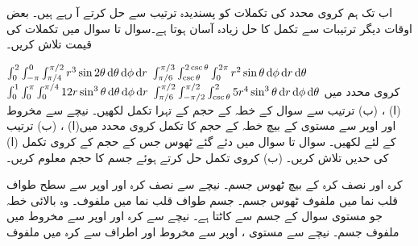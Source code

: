 اب تک ہم   کروی  محدد کی تکملات  کو پسندیدہ  ترتیب   سے حل کرتے آ رہے ہیں۔ بعض اوقات دیگر ترتیبات سے تکمل کا حل زیادہ آسان ہوتا ہے۔سوال  تا سوال  میں تکملات کی قیمت تلاش کریں۔

$\int_{0}^{2}\int_{-\pi}^{0}\int_{\pi/4}^{\pi/2} r^3 \sin 2\theta \dif \theta\dif \phi\dif r$
$\int_{\pi/6}^{\pi/3}\int_{\csc\theta}^{2\csc\theta}\int_{0}^{2\pi} r^2\sin\theta\dif\phi \dif r\dif \theta$
$\int_{0}^{1}\int_{0}^{\pi}\int_{0}^{\pi/4} 12r\sin^3\theta\dif \theta\dif \phi\dif r$
$\int_{\pi/6}^{\pi/2}\int_{-\pi/2}^{\pi/2}\int_{\csc\theta}^{2}5r^4\sin^3\theta \dif r\dif \phi\dif \theta$
کروی محدد میں (ا) ، (ب)  ترتیب سے سوال   کے خطہ کے حجم  کے  تہرا  تکمل لکھیں۔ 
نیچے سے مخروط    اور اوپر سے مستوی   کے بیچ خطہ   کے حجم کا تکمل کروی محدد میں(ا)  ، (ب)  ترتیب    کے لئے  لکھیں۔
سوال  تا سوال  میں  دئے گئے ٹھوس جس کے حجم کے کروی تکمل (ا) کی حدیں تلاش کریں۔ (ب) کروی تکمل حل کرتے  ہوئے جسم کا حجم معلوم کریں۔

کرہ  اور نصف کرہ  کے بیچ ٹھوس جسم۔
نیچے سے نصف کرہ  اور اوپر سے سطح طواف قلب نما   میں ملفوف  ٹھوس جسم۔
جسم طواف قلب نما    میں ملفوف۔
وہ  بالائی خطہ جو مستوی  سوال  کے جسم سے  کاٹتا ہے۔
نیچے سے کرہ   اور اوپر سے مخروط  میں ملفوف جسم۔
نیچے سے مستوی ، اوپر سے  مخروط  اور اطراف سے کرہ  میں ملفوف

